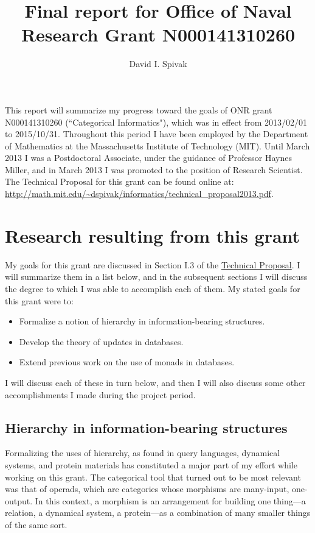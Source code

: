 \documentclass[11pt,oneside,article]{memoir}
\begin{document}
\author{David I. Spivak}

\title{Final report for Office of Naval Research Grant N000141310260}

\maketitle

This report will summarize my progress toward the goals of ONR grant N000141310260 (``Categorical Informatics"), which was in effect from 2013/02/01 to 2015/10/31. Throughout this period I have been employed by the Department of Mathematics at the Massachusetts Institute of Technology (MIT). Until March 2013 I was a Postdoctoral Associate, under the guidance of Professor Haynes Miller, and in March 2013 I was promoted to the position of  Research Scientist. The Technical Proposal for this grant can be found online at: \url{http://math.mit.edu/~dspivak/informatics/technical_proposal2013.pdf}.

\tableofcontents

\chapter{Research resulting from this grant}

My goals for this grant are discussed in Section I.3 of the \href{http://math.mit.edu/~dspivak/informatics/grants/technical_proposalONR--2013.pdf}{Technical Proposal}. I will summarize them in a list below, and in the subsequent sections I will discuss the degree to which I was able to accomplish each of them. My stated goals for this grant were to:
\begin{itemize}
\item Formalize a notion of hierarchy in information-bearing structures.
\item Develop the theory of updates in databases.
\item Extend previous work on the use of monads in databases.
\end{itemize}
I will discuss each of these in turn below, and then I will also discuss some other accomplishments I made during the project period.

\section{Hierarchy in information-bearing structures}\label{sec:hierarchy}

Formalizing the uses of hierarchy, as found in query languages, dynamical systems, and protein materials has constituted a major part of my effort while working on this grant. The categorical tool that turned out to be most relevant was that of operads, which are categories whose morphisms are many-input, one-output. In this context, a morphism is an arrangement for building one thing---a relation, a dynamical system, a protein---as a combination of many smaller things of the same sort. 
\end{document}
